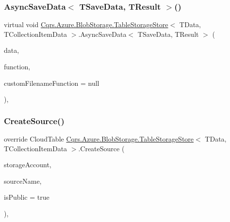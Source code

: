 \subsubsection{\texorpdfstring{Async\+Save\+Data$<$ T\+Save\+Data, T\+Result $>$()}{AsyncSaveData< TSaveData, TResult >()}}
{\footnotesize\ttfamily virtual void \hyperlink{classCqrs_1_1Azure_1_1BlobStorage_1_1TableStorageStore}{Cqrs.\+Azure.\+Blob\+Storage.\+Table\+Storage\+Store}$<$ T\+Data, T\+Collection\+Item\+Data $>$.Async\+Save\+Data$<$ T\+Save\+Data, T\+Result $>$ (\begin{DoxyParamCaption}\item[{T\+Save\+Data}]{data,  }\item[{Func$<$ T\+Save\+Data, Cloud\+Table, T\+Result $>$}]{function,  }\item[{Func$<$ T\+Save\+Data, string $>$}]{custom\+Filename\+Function = {\ttfamily null} }\end{DoxyParamCaption})\hspace{0.3cm}{\ttfamily [protected]}, {\ttfamily [virtual]}}

\mbox{\label{classCqrs_1_1Azure_1_1BlobStorage_1_1TableStorageStore_ad504317a3b2c07172f50b8e7b8d0f78e_ad504317a3b2c07172f50b8e7b8d0f78e}} 
\subsubsection{\texorpdfstring{Create\+Source()}{CreateSource()}}
{\footnotesize\ttfamily override Cloud\+Table \hyperlink{classCqrs_1_1Azure_1_1BlobStorage_1_1TableStorageStore}{Cqrs.\+Azure.\+Blob\+Storage.\+Table\+Storage\+Store}$<$ T\+Data, T\+Collection\+Item\+Data $>$.Create\+Source (\begin{DoxyParamCaption}\item[{Cloud\+Storage\+Account}]{storage\+Account,  }\item[{string}]{source\+Name,  }\item[{bool}]{is\+Public = {\ttfamily true} }\end{DoxyParamCaption})\hspace{0.3cm}{\ttfamily [protected]}, {\ttfamily [virtual]}}



